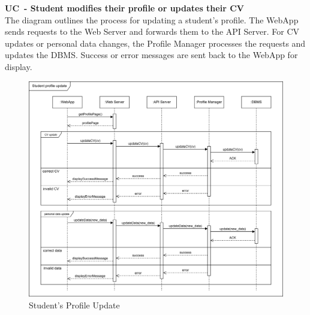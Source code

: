 \textbf{UC\cuc\  - Student modifies their profile or updates their CV} \\
The diagram outlines the process for updating a student's profile. The WebApp sends requests to the Web Server and forwards them to the API Server. For CV updates or personal data changes, the Profile Manager processes the requests and updates the DBMS. Success or error messages are sent back to the WebApp for display.
\begin{center}
    \begin{figure}[H]
        \centering
        \includegraphics[width=1\linewidth]{Images/Sequence diagrams/UC4.png}
        \caption{Student's Profile Update}
        \label{fig:enter-label}
    \end{figure}
\end{center}

